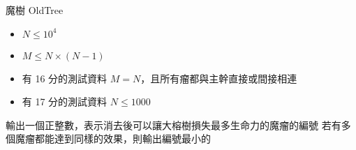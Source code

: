 \begin{problem}{魔樹 OldTree}
\begin{iofmt}
\begin{itemize}
	\item $N \leq 10^4$
	\item $M \leq N \times (N-1)$
	\item 有 16 分的測試資料 $M = N$，且所有瘤都與主幹直接或間接相連
	\item 有 17 分的測試資料 $N \leq 1000$
\end{itemize}
\end{iofmt}

\OutputFile

輸出一個正整數，表示消去後可以讓大榕樹損失最多生命力的魔瘤的編號 \newline
若有多個魔瘤都能達到同樣的效果，則輸出編號最小的 \newline

\Examples

\begin{example}
%
%
\end{example}

\end{problem}
